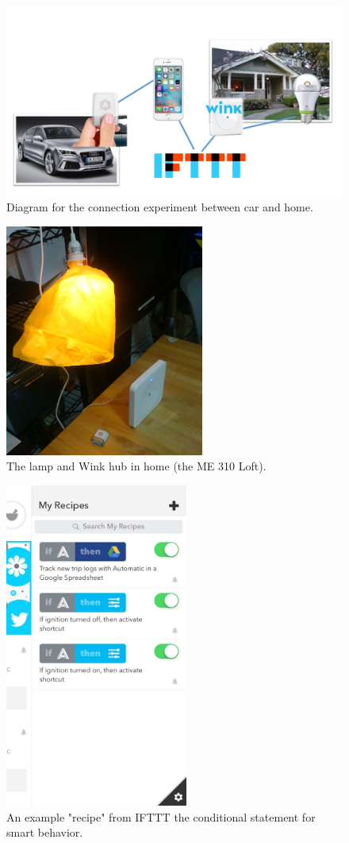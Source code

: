 \begin{figure}
\centering
	\includegraphics[keepaspectratio, width=5in]{Figures/BenchmarkingOld/Benchmarking_Experiment.jpg}
	\caption{Diagram for the connection experiment between car and home.}
    \label{fig.Benchmarking1}
\end{figure}
\begin{figure}
\centering
	\includegraphics[keepaspectratio, height=3in]{Figures/BenchmarkingOld/Experiment.jpg}
	\caption{The lamp and Wink hub in home (the ME 310 Loft).}
    \label{fig.Benchmarking2}
\end{figure}

\begin{figure}
\centering
	\includegraphics[keepaspectratio, height=4.2in]{Figures/BenchmarkingOld/IFTTT_screen.jpg}
	\caption{An example "recipe" from IFTTT the conditional statement for smart behavior.}
    \label{fig.Benchmarking3}
\end{figure}
